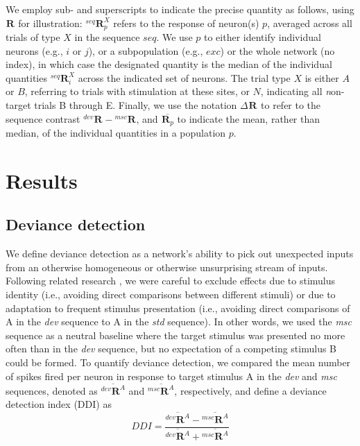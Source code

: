 \documentclass[9pt,lineno,onehalfspacing]{elife}
\newcommand{\dev}{\textit{dev}}
\newcommand{\msc}{\textit{msc}}
\newcommand{\std}{\textit{std}}
\newcommand{\R}[3][]{{}^{#1}_{}\boldsymbol R^{#2}_{#3}}
\newcommand{\mean}[1]{\overline{#1}}
\begin{document}
We employ sub- and superscripts to indicate the precise quantity as follows, using $\R{}{}$ for illustration: $\R[seq]{X}{p}$ refers to the response of neuron(s) $p$, averaged across all trials of type $X$ in the sequence $seq$. We use $p$ to either identify individual neurons (e.g., $i$ or $j$), or a subpopulation (e.g., $exc$) or the whole network (no index), in which case the designated quantity is the median of the individual quantities $\R[seq]{X}{i}$ across the indicated set of neurons. The trial type $X$ is either $A$ or $B$, referring to trials with stimulation at these sites, or $N$, indicating all \textit{n}on-target trials B through E. Finally, we use the notation $\Delta \R{}{}$ to refer to the sequence contrast $\R[dev]{}{} - \R[msc]{}{}$, and $\mean{\R{}{p}}$ to indicate the mean, rather than median, of the individual quantities in a population $p$.

\section{Results}\label{sec:results}

\subsection{Deviance detection}\label{sec:dd}

We define deviance detection as a network's ability to pick out unexpected inputs from an otherwise homogeneous or otherwise unsurprising stream of inputs. Following related research \citep{Kubota2021-dx,Harms2014-ah,Jacobsen2001-sc}, we were careful to exclude effects due to stimulus identity (i.e., avoiding direct comparisons between different stimuli) or due to adaptation to frequent stimulus presentation (i.e., avoiding direct comparisons of A in the \dev{} sequence to A in the \std{} sequence). In other words, we used the \msc{} sequence as a neutral baseline where the target stimulus was presented no more often than in the \dev{} sequence, but no expectation of a competing stimulus B could be formed. To quantify deviance detection, we compared the mean number of spikes fired per neuron in response to target stimulus A in the \dev{} and \msc{} sequences, denoted as $\mean{\R[dev]{A}{}}$ and $\mean{\R[msc]{A}{}}$, respectively, and define a deviance detection index (DDI) as
\begin{equation}
    DDI = \frac{\mean{\R[dev]{A}{}} - \mean{\R[msc]{A}{}}}{\mean{\R[dev]{A}{}} + \mean{\R[msc]{A}{}}} \label{eq:ddi}
\end{equation}
\end{document}

